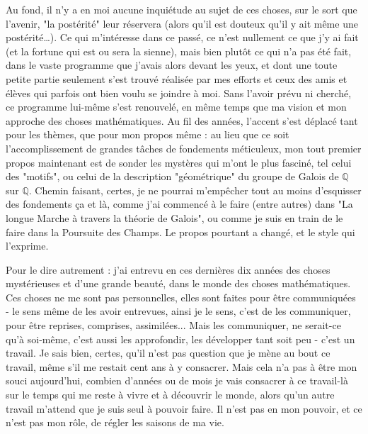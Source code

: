 Au fond, il n'y a en moi aucune inquiétude au sujet de ces choses, sur le sort que l'avenir, "la postérité" leur réservera (alors qu'il est douteux qu'il y ait même une postérité…). Ce qui m’intéresse dans ce passé, ce n'est nullement ce que j'y ai fait (et la fortune qui est ou sera la sienne), mais bien plutôt ce qui n'a pas été fait, dans le vaste programme que j'avais alors devant les yeux, et dont une toute petite partie seulement s'est trouvé réalisée par mes efforts et ceux des amis et élèves qui parfois ont bien voulu se joindre à moi. Sans l'avoir prévu ni cherché, ce programme lui-même s'est renouvelé, en même temps que ma vision et mon approche des choses mathématiques. Au fil des années, l'accent s'est déplacé tant pour les thèmes, que pour mon propos même : au lieu que ce soit l'accomplissement de grandes tâches de fondements méticuleux, mon tout premier propos maintenant est de sonder les mystères qui m'ont le plus fasciné, tel celui des "motifs", ou celui de la description "géométrique" du groupe de Galois de \(\mathbb{Q}\) sur \(\mathbb{Q}\). Chemin faisant, certes, je ne pourrai m'empêcher tout au moins d'esquisser des fondements ça et là, comme j'ai commencé à le faire (entre autres) dans "La longue Marche à travers la théorie de Galois", ou comme je suis en train de le faire dans la Poursuite des Champs. Le propos pourtant a changé, et le style qui l'exprime.

Pour le dire autrement : j'ai entrevu en ces dernières dix années des choses mystérieuses et d'une grande beauté, dans le monde des choses mathématiques. Ces choses ne me sont pas personnelles, elles sont faites pour être communiquées - le sens même de les avoir entrevues, ainsi je le sens, c'est de les communiquer, pour être reprises, comprises, assimilées... Mais les communiquer, ne serait-ce qu'à soi-même, c'est aussi les approfondir, les développer tant soit peu - c'est un travail. Je sais bien, certes, qu'il n'est pas question que je mène au bout ce travail, même s’il me restait cent ans à y consacrer. Mais cela n’a pas à être mon souci aujourd'hui, combien d'années ou de mois je vais consacrer à ce travail-là sur le temps qui me reste à vivre et à découvrir le monde, alors qu’un autre travail m’attend que je suis seul à pouvoir faire. Il n’est pas en mon pouvoir, et ce n'est pas mon rôle, de régler les saisons de ma vie.